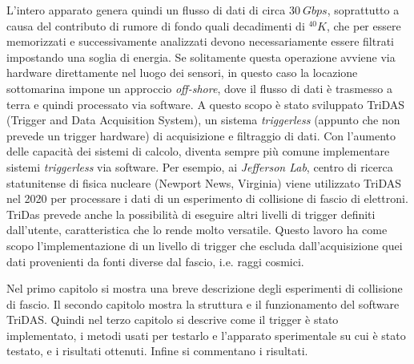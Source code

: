 \documentclass[../main.tex]{subfiles}
\begin{document}
    
    L'intero apparato genera quindi un flusso di dati di circa $30\ Gbps$, soprattutto a causa del contributo di rumore di fondo quali decadimenti di ${}^{40}K$, che per essere memorizzati e successivamente analizzati devono necessariamente essere filtrati impostando una soglia di energia. Se solitamente questa operazione avviene via hardware direttamente nel luogo dei sensori, in questo caso la locazione sottomarina impone un approccio \emph{off-shore}, dove il flusso di dati è trasmesso a terra e quindi processato via software. A questo scopo è stato sviluppato TriDAS (Trigger and Data Acquisition System), un sistema \emph{triggerless} (appunto che non prevede un trigger hardware) di acquisizione e filtraggio di dati. Con l'aumento delle capacità dei sistemi di calcolo, diventa sempre più comune implementare sistemi \emph{triggerless} via software. Per esempio, ai \emph{Jefferson Lab}, centro di ricerca statunitense di fisica nucleare (Newport News, Virginia) viene utilizzato TriDAS nel 2020 per processare i dati di un esperimento di collisione di fascio di elettroni. TriDas prevede anche la possibilità di eseguire altri livelli di trigger definiti dall'utente, caratteristica che lo rende molto versatile. Questo lavoro ha come scopo l'implementazione di un livello di trigger che escluda dall'acquisizione quei dati provenienti da fonti diverse dal fascio, i.e. raggi cosmici.

    Nel primo capitolo si mostra una breve descrizione degli esperimenti di collisione di fascio.
    Il secondo capitolo mostra la struttura e il funzionamento del software TriDAS.
    Quindi nel terzo capitolo si descrive come il trigger è stato implementato, i metodi usati per testarlo e l'apparato sperimentale su cui è stato testato, e i risultati ottenuti.
    Infine si commentano i risultati.
\end{document}
